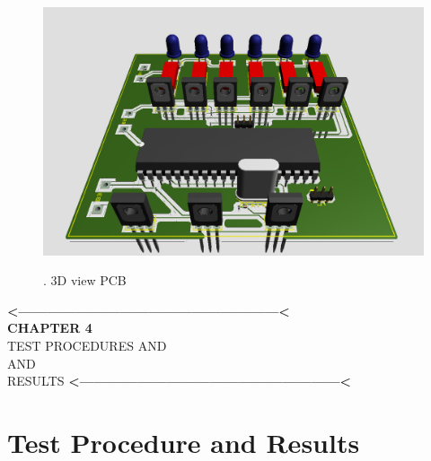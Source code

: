 \documentclass[a4paper,12pt]{article}
\begin{document}
\begin{figure}[!h]
\centering
\includegraphics[scale=0.5]{3dpcb.png}\\
\caption{. 3D view PCB}
\end{figure}

\newpage

\newpage
\newpage
\thispagestyle{empty}
\vspace*{0.25\textheight}
\begin{center}
\begin{center}
{\bfseries\LARGE <------------------------------------------------------<}\\
{\bfseries\LARGE CHAPTER 4}\\[2cm]


{\scshape\Huge TEST PROCEDURES AND}\\[0.5cm]
{\scshape\Huge AND}\\[0.5cm]
{\scshape\Huge RESULTS}
{\bfseries\LARGE <------------------------------------------------------<}
\end{center}
\end{center}
\newpage
\section{Test Procedure and Results}
\end{document}
